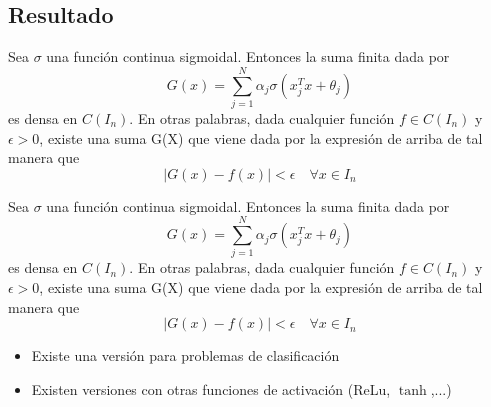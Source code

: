 \subsection{Resultado}
\begin{frame}
    \begin{overprint}
        \begin{theorem}
           Sea $\sigma$ una función continua sigmoidal. Entonces la suma finita dada por 
               \begin{equation}
                   G(x) = \sum_{j=1}^N \alpha_j \sigma(x_j^T x + \theta_j)
               \end{equation}
           \noindent es densa en $C(I_n)$. En otras palabras, dada cualquier función $f \in C(I_n)$ y $\epsilon > 0$, existe una suma G(X) que viene dada por la expresión de arriba de tal manera que 
           \begin{equation}
               |G(x) - f(x)| < \epsilon \quad \forall x \in I_n
           \end{equation}
        \end{theorem}
        
        
            \begin{theorem}
           Sea $\sigma$ una función continua sigmoidal. Entonces la suma finita dada por 
               \begin{equation}
                   G(x) = \sum_{j=1}^N \alpha_j \sigma(x_j^T x + \theta_j)
               \end{equation}
           \noindent es densa en $C(I_n)$. En otras palabras, dada cualquier función $f \in C(I_n)$ y $\epsilon > 0$, existe una suma G(X) que viene dada por la expresión de arriba de tal manera que 
           \begin{equation}
               |G(x) - f(x)| < \epsilon \quad \forall x \in I_n
           \end{equation}
        \end{theorem}
        
    
        \begin{itemize}
            \item Existe una versión para problemas de clasificación
            \item Existen versiones con otras funciones de activación (ReLu, $\tanh$,...)
        \end{itemize}
        
\end{overprint}
\end{frame}